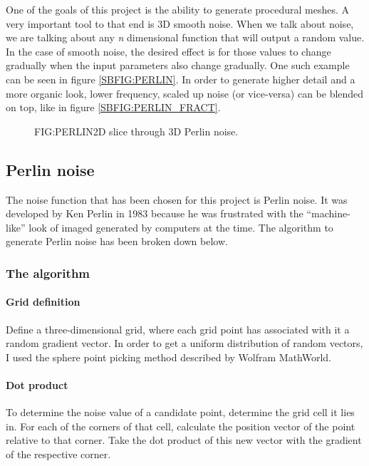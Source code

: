 One of the goals of this project is the ability to generate procedural meshes.
A very important tool to that end is 3D smooth noise.
When we talk about noise,
we are talking about any \textit{n} dimensional function that will output a random value.
In the case of smooth noise,
the desired effect is for those values to change gradually when the input parameters also change gradually.
One such example can be seen in figure \ref{SBFIG:PERLIN}.
In order to generate higher detail and a more organic look,
lower frequency, scaled up noise (or vice-versa) can be blended on top,
like in figure \ref{SBFIG:PERLIN_FRACT}.

\begin{figure}[Perlin noise example]{FIG:PERLIN}{2D slice through 3D Perlin noise.}
\end{figure}

\subsection{Perlin noise}

The noise function that has been chosen for this project is Perlin noise.
It was developed by Ken Perlin in 1983 because he was frustrated with the ``machine-like'' look of imaged generated by computers at the time.\cite{making_noise}
The algorithm to generate Perlin noise has been broken down below.

\subsubsection{The algorithm}

\paragraph{Grid definition}
Define a three-dimensional grid,
where each grid point has associated with it a random gradient vector.
In order to get a uniform distribution of random vectors,
I used the sphere point picking method described by Wolfram MathWorld\cite{sphere_point}.

\paragraph{Dot product}
To determine the noise value of a candidate point,
determine the grid cell it lies in.
For each of the corners of that cell,
calculate the position vector of the point relative to that corner.
Take the dot product of this new vector with the gradient of the respective corner.

